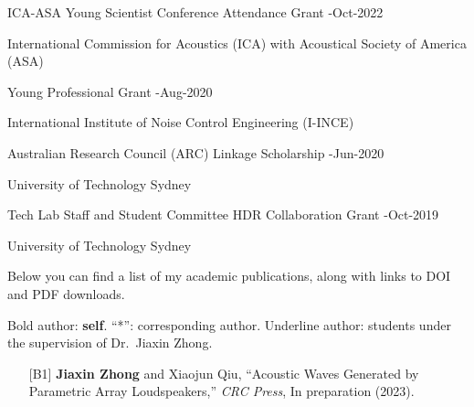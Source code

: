 \documentclass[10pt,a4paper,ragged2e,withhyper]{altacv}
\newcommand{\PubMe}[1]{\textbf{#1}}
\begin{document}






{\color{accent}ICA-ASA Young Scientist Conference Attendance Grant} 
\hfill {}-Oct-2022
\par
International Commission for
Acoustics (ICA) with Acoustical Society of America (ASA)

\divider

{\color{accent}Young Professional Grant}
\hfill {}-Aug-2020
\par
International Institute of Noise Control Engineering (I-INCE)

\divider

{\color{accent}Australian Research Council (ARC) Linkage Scholarship}
\hfill {}-Jun-2020
\par
University of Technology Sydney

\divider

{\color{accent}Tech Lab Staff and Student Committee HDR Collaboration Grant}
\hfill {}-Oct-2019
\par
University of Technology Sydney


\newpage
{}

Below you can find a list of my academic publications, along with links to {\color{accent}\aiDoi} DOI and {\color{accent}\faFilePdf[regular]} PDF downloads.

Bold author: \textbf{self}.
``*'': corresponding author.
Underline author: students under the supervision of Dr.\ Jiaxin Zhong.

\vspace{.5cm}


\begin{itemize}[leftmargin = 25pt]
    \justifying 
    \item[{[B1]}] \PubMe{Jiaxin Zhong} and Xiaojun Qiu, 
    ``Acoustic Waves Generated by Parametric Array Loudspeakers,'' 
    \textit{CRC Press}, In preparation (2023).
\end{itemize}
\end{document}
